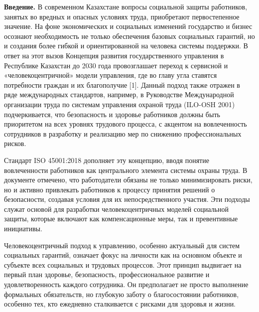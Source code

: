 {\bfseries Введение.} В современном Казахстане вопросы социальной защиты
работников, занятых во вредных и опасных условиях труда, приобретают
первостепенное значение. На фоне экономических и социальных изменений
государство и бизнес осознают необходимость не только обеспечения
базовых социальных гарантий, но и создания более гибкой и
ориентированной на человека системы поддержки. В ответ на этот вызов
Концепция развития государственного управления в Республике Казахстан до
2030 года провозглашает переход к сервисной и «человекоцентричной»
модели управления, где во главу угла ставятся потребности граждан и их
благополучие {[}1{]}. Данный подход также отражен в ряде международных
стандартов, например, в Руководстве Международной организации труда по
системам управления охраной труда (ILO-OSH 2001) подчеркивается, что
безопасность и здоровье работников должны быть приоритетом на всех
уровнях трудового процесса, с акцентом на вовлеченность сотрудников в
разработку и реализацию мер по снижению профессиональных
рисков\hspace{0pt}.

Стандарт ISO 45001:2018 дополняет эту концепцию, вводя понятие
вовлеченности работников как центрального элемента системы охраны труда.
В документе отмечено, что работодатели обязаны не только минимизировать
риски, но и активно привлекать работников к процессу принятия решений о
безопасности, создавая условия для их непосредственного
участия\hspace{0pt}. Эти подходы служат основой для разработки
человекоцентричных моделей социальной защиты, которые включают как
компенсационные меры, так и превентивные инициативы.

Человекоцентричный подход к управлению, особенно актуальный для систем
социальных гарантий, означает фокус на личности как на основном объекте
и субъекте всех социальных и трудовых процессов. Этот принцип выдвигает
на первый план здоровье, безопасность, профессиональное развитие и
удовлетворенность каждого сотрудника. Он предполагает не просто
выполнение формальных обязательств, но глубокую заботу о благосостоянии
работников, особенно тех, кто ежедневно сталкивается с рисками для
здоровья и жизни.

